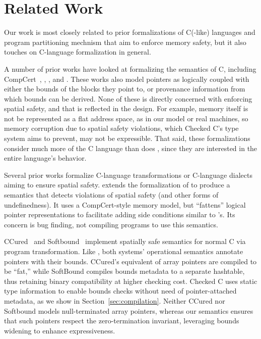 \section{Related Work}
\label{sec:related}

Our work is most closely related to prior formalizations of C(-like)
languages and program partitioning mechnism 
that aim to enforce memory safety, but it also touches on
C-language formalization in general.


%
A number of prior works have looked at formalizing the semantics of C,
including CompCert~\cite{Blazy2009,leroy:hal-00703441},
\citet{ellison-rosu-2012-popl}, \citet{Kang:2015:FCM:2813885.2738005},
and \citet{10.1145/2980983.2908081, Memarian:2019:ECS:3302515.3290380}. These works also model
pointers as logically coupled with either the bounds of the blocks
they point to, or provenance information from which bounds can be
derived. None of these is directly concerned with enforcing
spatial safety, and that is reflected in the design. For example,
memory itself is not be represented as a flat address space, as in our
model or real machines, so memory corruption due to spatial safety
violations, which Checked C's type system aims to prevent, may not be
expressible. That said, these formalizations consider much more of the
C language than does \lang, since they are interested in the entire
language's behavior.

%
Several prior works formalize C-language transformations or C-language
dialects aiming to ensure spatial safety. 
%
\citet{10.1145/2813885.2737979} extends the formalization
of \citet{ellison-rosu-2012-popl} to produce a semantics that detects
violations of spatial safety (and other forms of undefinedness). It
uses a CompCert-style memory model, but ``fattens'' logical pointer
representations to facilitate adding side conditions similar to \lang's.
Its concern is bug finding, not compiling programs to
use this semantics.

CCured~\cite{Necula2005} and Softbound~\cite{softbound} implement
spatially safe semantics for normal C via program transformation. Like
\lang, both systems' operational semantics annotate pointers with
their bounds. CCured's equivalent of array pointers are compiled to be
``fat,'' while SoftBound compiles bounds metadata to a separate
hashtable, thus retaining binary compatibility at higher checking
cost. Checked C uses static type information to enable bounds checks
without need of pointer-attached metadata, as we show in
Section~\ref{sec:compilation}. Neither CCured nor Softbound models
null-terminated array pointers, whereas our semantics ensures that
such pointers respect the zero-termination invariant, leveraging
bounds widening to enhance expressiveness.

